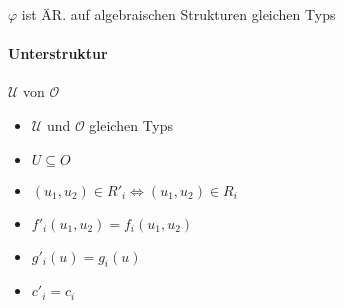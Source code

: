 $\varphi$ ist ÄR. auf algebraischen Strukturen gleichen Typs

\paragraph{Unterstruktur} $\mathcal{U}$ von $\mathcal{O}$

\begin{itemize}
  \item $\mathcal{U}$ und $\mathcal{O}$ gleichen Typs
  \item $U \subseteq O$
  \item $(u_1, u_2) \in R'_i \Leftrightarrow (u_1, u_2) \in R_i$
  \item $f'_i(u_1, u_2) = f_i(u_1, u_2)$
  \item $g'_i(u) = g_i(u)$
  \item $c'_i = c_i$
\end{itemize}